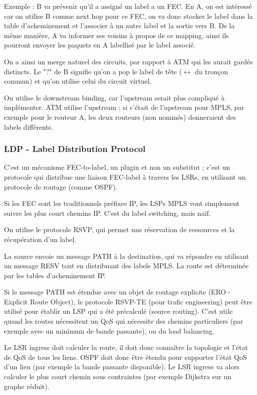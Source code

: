 		
		Exemple : B va prévenir qu'il a assigné un label a un FEC. En A, on est intéressé car on utilise B comme next hop pour ce FEC, on va donc stocker le label dans la table d'acheminement et l'associer à un autre label et la sortie vers B. De la même manière, A va informer ses voisins à propos de ce mapping, ainsi ils pourront envoyer les paquets en A labellisé par le label associé.
		
		
		On a ainsi un merge naturel des circuits, par rapport à ATM qui les aurait gardés distincts. Le "?"  de B signifie qu'on a pop le label de tête ($\leftrightarrow$ du tronçon commun) et qu'on utilise celui du circuit virtuel.
		
		On utilise le downstream binding, car l'upstream serait plus compliqué à implémenter. ATM utilise l'upstream ; si c'était de l'upstream pour MPLS, par exemple pour le routeur A, les deux routeurs (non nommés) donneraient des labels différents.
		
		\subsubsection{LDP - Label Distribution Protocol}
		
		C'est un mécanisme FEC-to-label, un plugin et non un substitut ; c'est un protocole qui distribue une liaison FEC-label à travers les LSRs, en utilisant un protocole de routage (comme OSPF).
		
		Si les FEC sont les traditionnels préfixes IP, les LSPs MPLS vont simplement suivre les plus court chemins IP. C'est du label switching, mais naïf.
	
		On utilise le protocole RSVP, qui permet une réservation de ressources et la récupération d'un label. 
		
		
		La source envoie un message PATH à la destination, qui va répondre en utilisant un message RESV tout en distribuant des labels MPLS. La route est déterminée par les tables d'acheminement IP.
		
		Si le message PATH est étendue avec un objet de routage explicite (ERO - Explicit Route Object), le protocole RSVP-TE (pour trafic engineering) peut être utilisé pour établir un LSP qui a été précalculé (source routing). C'est utile quand les routes nécessitent un QoS qui nécessite des chemins particuliers (par exemple avec un minimum de bande passante), ou du load balancing.
		
		Le LSR ingress doit calculer la route, il doit donc connaître la topologie et l'état de QoS de tous les liens. OSPF doit donc être étendu pour supporter l'état QoS d'un lien (par exemple la bande passante disponible). Le LSR ingress va alors calculer le plus court chemin sous contraintes (par exemple Dijkstra sur un graphe réduit).